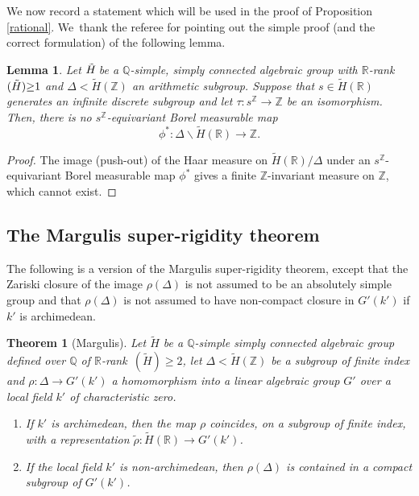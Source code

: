 \documentclass[JEP,XML,SOM,Unicode,published]{cedram}
\newtheorem{theorem}{Theorem}
\newtheorem{lemma}{Lemma}
\theoremstyle{definition}
\newcommand{\field}[1]{\mathbb{#1}}
\newcommand{\Q}{\field{Q}}
\newcommand{\R}{\field{R}}
\newcommand{\Z}{\field{Z}}
\let\bs\backslash
\begin{document}
We now record a statement which will be used in the proof of Proposition \ref{rational}. We~thank the referee for pointing out the simple proof (and the correct formulation) of the following lemma.\enlargethispage{.5\baselineskip}

\begin{lemma}\label{useful} Let $\tilde{H}\mkern-3mu$ be a $\Q$-simple, simply connected algebraic group with \hbox{$\R$-rank$(\tilde{H})\mkern-5mu\geq\mkern-5mu 1$} and $\Delta <\tilde{H}(\Z)$ an arithmetic subgroup. Suppose that $s\in \tilde{H}(\R)$ generates an infinite discrete subgroup and let
$\tau:s^{\Z}\to \Z$ be an isomorphism. Then, there is no $s^{\Z}$\nobreakdash-equivariant Borel measurable map
\[
\phi^*:\Delta \bs \tilde{H}(\R)\to \Z.
\]
\end{lemma}

\begin{proof} The image (push-out) of the Haar measure on $\tilde{H}(\R)/\Delta$ under an $s^{\Z}$\nobreakdash-equi\-variant Borel measurable map $\phi^*$ gives a finite $\Z$-invariant measure on $\Z$, which cannot exist.
\end{proof}

\subsection{The Margulis super-rigidity theorem} The following is a version of the Margulis super-rigidity theorem, except that the Zariski closure of the image $\rho (\Delta)$ is not assumed to be an absolutely simple group and that $\rho (\Delta)$ is not assumed to have non-compact closure in $G'(k')$ if $k'$ is archimedean.

\begin{theorem}[Margulis]\label{super-rigid} Let $\tilde{H}$ be a $\Q$-simple simply connected algebraic group defined over $\Q$ of $\R$-rank~$(\tilde H)\geq 2$, let $\Delta < \tilde{H}(\Z)$ be a subgroup of finite index and $\rho : \Delta \to G'(k')$ a homomorphism into a linear algebraic group $G'$ over a local field $k'$ of characteristic zero.

\begin{enumerate}
\item If $k'$ is archimedean, then the map $\rho $ coincides, on a subgroup of finite
index, with a representation $\tilde \rho: \tilde H(\R) \to G'(k')$.

\item If the local
field $k'$ is non-archimedean, then $\rho (\Delta)$ is contained in a
compact subgroup of $G'(k')$.
\end{enumerate}
\end{theorem}
\end{document}
